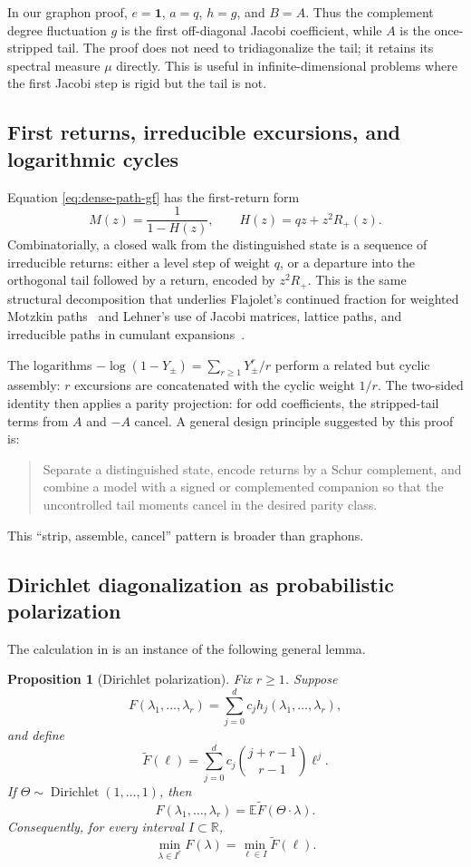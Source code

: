 \documentclass[11pt]{article}
\newtheorem{proposition}[theorem]{Proposition}
\newcommand{\one}{\mathbf 1}
\newcommand{\R}{\mathbb R}
\newcommand{\E}{\mathbb E}
\begin{document}
In our graphon proof, \(e=\one\), \(a=q\), \(h=g\), and \(B=A\).  Thus the
complement degree fluctuation \(g\) is the first off-diagonal Jacobi
coefficient, while \(A\) is the once-stripped tail.  The proof does not need
to tridiagonalize the tail; it retains its spectral measure \(\mu\) directly.
This is useful in infinite-dimensional problems where the first Jacobi step
is rigid but the tail is not.

\subsection{First returns, irreducible excursions, and logarithmic cycles}

Equation \eqref{eq:dense-path-gf} has the first-return form
\[
       M(z)=\frac1{1-H(z)},
       \qquad H(z)=qz+z^2R_+(z).
\]
Combinatorially, a closed walk from the distinguished state is a sequence of
irreducible returns: either a level step of weight \(q\), or a departure into
the orthogonal tail followed by a return, encoded by \(z^2R_+\).  This is
the same structural decomposition that underlies Flajolet's continued
fraction for weighted Motzkin paths~\cite{Flajolet1980} and Lehner's use of
Jacobi matrices, lattice paths, and irreducible paths in cumulant
expansions~\cite{Lehner2003}.

The logarithms \(-\log(1-Y_\pm)=\sum_{r\ge1}Y_\pm^r/r\) perform a related
but cyclic assembly: \(r\) excursions are concatenated with the cyclic
weight \(1/r\).  The two-sided identity then applies a parity projection:
for odd coefficients, the stripped-tail terms from \(A\) and \(-A\) cancel.
A general design principle suggested by this proof is:
\begin{quote}
Separate a distinguished state, encode returns by a Schur complement, and
combine a model with a signed or complemented companion so that the
uncontrolled tail moments cancel in the desired parity class.
\end{quote}
This ``strip, assemble, cancel'' pattern is broader than graphons.

\subsection{Dirichlet diagonalization as probabilistic polarization}

The calculation in  is an instance of the following
general lemma.

\begin{proposition}[Dirichlet polarization]\label{prop:general-dirichlet}
Fix \(r\ge1\).  Suppose
\[
       F(\lambda_1,\ldots,\lambda_r)
       =\sum_{j=0}^d c_jh_j(\lambda_1,\ldots,\lambda_r),
\]
and define
\[
       \widetilde F(\ell)
       =\sum_{j=0}^d c_j\binom{j+r-1}{r-1}\ell^j.
\]
If \(\Theta\sim\operatorname{Dirichlet}(1,\ldots,1)\), then
\[
       F(\lambda_1,\ldots,\lambda_r)
       =\E\widetilde F(\Theta\cdot\lambda).
\]
Consequently, for every interval \(I\subset\R\),
\[
       \min_{\lambda\in I^r}F(\lambda)
       =\min_{\ell\in I}\widetilde F(\ell).
\]
\end{proposition}
\end{document}
